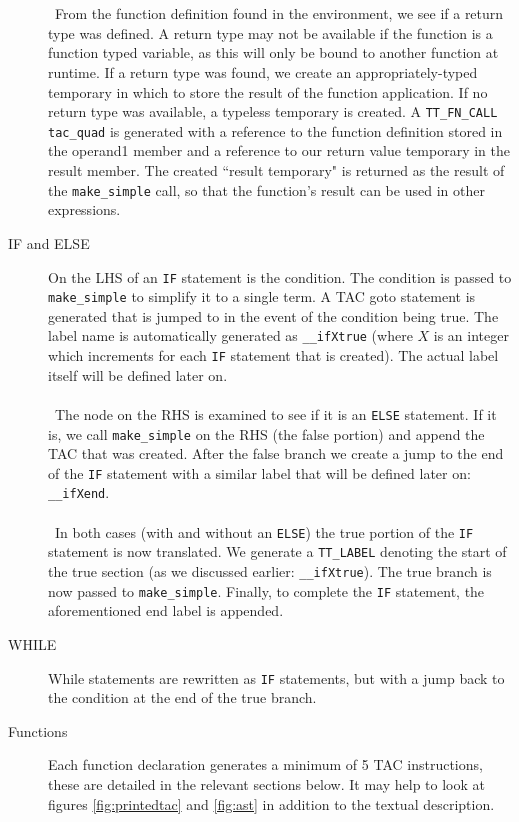\begin{description}
\\ \ \\ \
From the function definition found in the environment, we see if a return type was defined. A return type may not be available if the function is a function typed variable, as this will only be bound to another function at runtime. If a return type was found, we create an appropriately-typed temporary in which to store the result of the function application. If no return type was available, a typeless temporary is created. A \verb!TT_FN_CALL! \verb!tac_quad! is generated with a reference to the function definition stored in the operand1 member and a reference to our return value temporary in the result member. The created ``result temporary" is returned as the result of the \verb!make_simple! call, so that the function's result can be used in other expressions. 
	\item[IF and ELSE] On the LHS of an \verb!IF! statement is the condition. The condition is passed to \verb!make_simple! to simplify it to a single term. A TAC goto statement is generated that is jumped to in the event of the condition being true. The label name is automatically generated as \verb!__ifXtrue! (where $X$ is an integer which increments for each \verb!IF! statement that is created). The actual label itself will be defined later on.
\\ \ \\ \
The node on the RHS is examined to see if it is an \verb!ELSE! statement. If it is, we call \verb!make_simple! on the RHS (the false portion) and append the TAC that was created. After the false branch we create a jump to the end of the \verb!IF! statement with a similar label that will be defined later on: \verb!__ifXend!. 
\\ \ \\ \
In both cases (with and without an \verb!ELSE!) the true portion of the \verb!IF! statement is now translated. We generate a \verb!TT_LABEL! denoting the start of the true section (as we discussed earlier: \verb!__ifXtrue!). The true branch is now passed to \verb!make_simple!. Finally, to complete the \verb!IF! statement, the aforementioned end label is appended.
	\item[WHILE] While statements are rewritten as \verb!IF! statements, but with a jump back to the condition at the end of the true branch.
	\item[Functions] Each function declaration generates a minimum of 5 TAC instructions, these are detailed in the relevant sections below. It may help to look at figures \ref{fig:printedtac} and \ref{fig:ast} in addition to the textual description.

\end{description}
